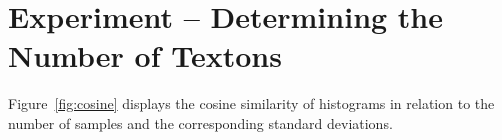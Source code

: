 \section{Experiment -- Determining the Number of Textons}
\label{sec:numtextons}

Figure~\ref{fig:cosine} displays the cosine similarity of histograms
in relation to the number of samples and the corresponding standard
deviations.